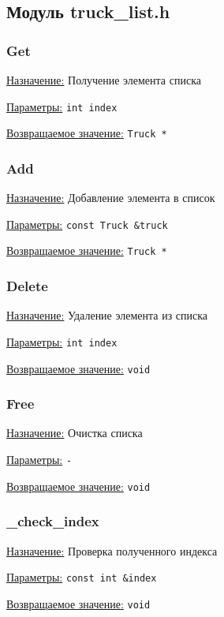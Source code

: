 \subsection{Модуль truck\_list.h}


\subsubsection{Get}

\underline{Назначение:} Получение элемента списка

\underline{Параметры:} \verb|int index|

\underline{Возвращаемое значение:} \verb|Truck *|


\subsubsection{Add}

\underline{Назначение:} Добавление элемента в список

\underline{Параметры:} \verb|const Truck &truck|

\underline{Возвращаемое значение:} \verb|Truck *|


\subsubsection{Delete}

\underline{Назначение:} Удаление элемента из списка

\underline{Параметры:} \verb|int index|

\underline{Возвращаемое значение:} \verb|void|


\subsubsection{Free}

\underline{Назначение:} Очистка списка

\underline{Параметры:} \verb|-|

\underline{Возвращаемое значение:} \verb|void|


\subsubsection{\_check\_index}

\underline{Назначение:} Проверка полученного индекса

\underline{Параметры:} \verb|const int &index|

\underline{Возвращаемое значение:} \verb|void|

